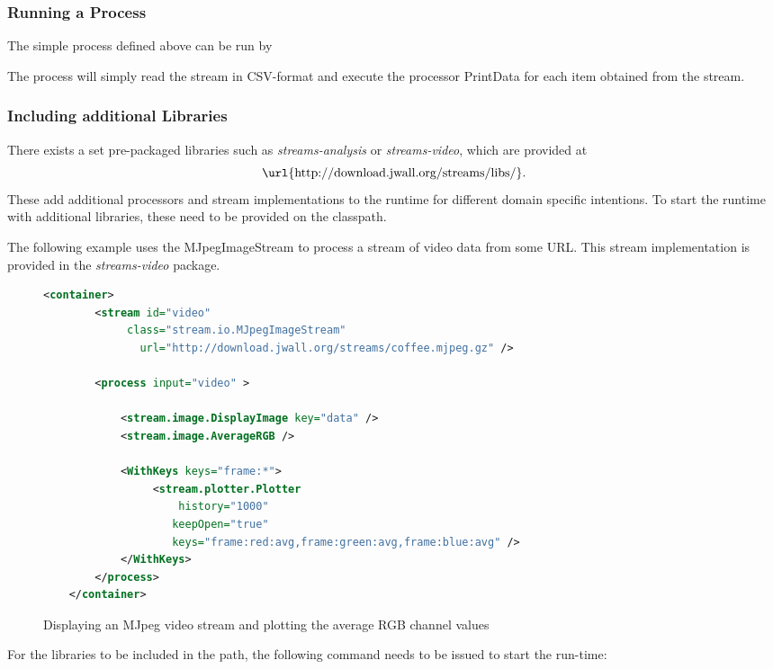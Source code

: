\subsubsection{Running a \streams Process}
The simple process defined above can be run by

\hspace{4ex}

The process will simply read the stream in CSV-format and execute the
processor {\ttfamily PrintData} for each item obtained from the
stream.

\subsubsection{Including additional Libraries}
There exists a set pre-packaged libraries such as {\em streams-analysis}
or {\em streams-video}, which are provided at
\begin{displaymath}
  \mbox{\url{http://download.jwall.org/streams/libs/}}.
\end{displaymath}
These add additional processors and stream implementations to the
\streams runtime for different domain specific intentions. To start
the \streams runtime with additional libraries, these need to be
provided on the classpath.

The following example uses the {\ttfamily MJpegImageStream} to process
a stream of video data from some URL. This stream implementation is
provided in the {\em streams-video} package.
\begin{figure}[h!]
  \centering
  \begin{lstlisting}[language=XML]
    <container>
        <stream id="video"
             class="stream.io.MJpegImageStream"
               url="http://download.jwall.org/streams/coffee.mjpeg.gz" />

        <process input="video" >

            <stream.image.DisplayImage key="data" />
            <stream.image.AverageRGB />

            <WithKeys keys="frame:*">
                 <stream.plotter.Plotter
       		         history="1000"
	                keepOpen="true"
	                keys="frame:red:avg,frame:green:avg,frame:blue:avg" />
            </WithKeys>
        </process>
    </container>
  \end{lstlisting}
  \caption{\label{fig:videoExample}Displaying an MJpeg video stream and plotting the average RGB channel values}
\end{figure}

For the libraries to be included in the path, the following command needs
to be issued to start the \streams run-time:

